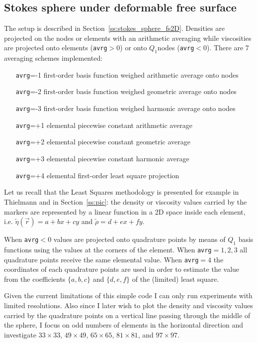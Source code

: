 \newpage
\subsection*{Stokes sphere under deformable free surface}

The setup is described in Section~\ref{ss:stokes_sphere_fs2D}. 
Densities are projected on the nodes or elements with an arithmetic averaging while
viscosities are projected onto elements ({\tt avrg}$>0$) or onto $Q_1$nodes ({\tt avrg}$<0$).
There are 7 averaging schemes implemented:
\begin{itemize}
\item[{\tt avrg}=-1] first-order basis function weighed arithmetic average onto nodes
\item[{\tt avrg}=-2] first-order basis function weighed geometric average onto nodes
\item[{\tt avrg}=-3] first-order basis function weighed harmonic average onto nodes
\item[{\tt avrg}=+1]  elemental piecewise constant arithmetic average 
\item[{\tt avrg}=+2]  elemental piecewise constant geometric average 
\item[{\tt avrg}=+3]  elemental piecewise constant harmonic average 
\item[{\tt avrg}=+4]  elemental first-order least square projection 
\end{itemize}

Let us recall that the Least Squares methodology is presented for example in 
Thielmann \etal \cite{thmk14} and in Section~\ref{ss:pic}:
the density or viscosity values carried by the markers are represented by a linear 
function in a 2D space inside each 
element, i.e. $\tilde{\eta}({\vec r}) = a + b x+c y$ and $\tilde{\rho}=d+ex+fy$.

When {\tt avrg}$<0$ values are projected onto quadrature points by means 
of $Q_1$ basis functions using the values at the corners of the element.
When {\tt avrg}$=1,2,3$ all quadrature points receive the same elemental value. 
When {\tt avrg}$=4$ the coordinates of each quadrature points are used in order to 
estimate the value from the coefficients $\{a,b,c\}$ and $\{d,e,f\}$ 
of the (limited) least square.

Given the current limitations of this simple code I can only run experiments with limited resolutions. 
Also since I later wish to plot the density and viscosity values carried by the quadrature points 
on a vertical line passing through the middle of the sphere, I focus on odd numbers of elements
in the horizontal direction and investigate $33\times33$, $49\times49$, $65\times65$, $81\times81$,
and $97\times97$.

